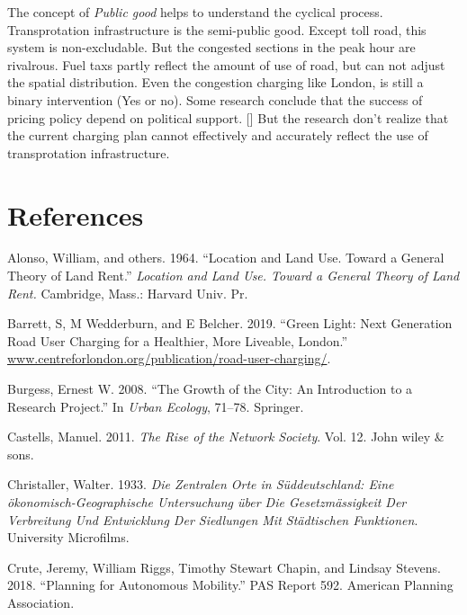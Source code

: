 \documentclass[12pt,]{article}
\begin{document}
The concept of \emph{Public good} helps to understand the cyclical
process. Transprotation infrastructure is the semi-public good. Except
toll road, this system is non-excludable. But the congested sections in
the peak hour are rivalrous. Fuel taxs partly reflect the amount of use
of road, but can not adjust the spatial distribution. Even the
congestion charging like London, is still a binary intervention (Yes or
no). Some research conclude that the success of pricing policy depend on
political support. {[}{]} But the research don't realize that the
current charging plan cannot effectively and accurately reflect the use
of transprotation infrastructure.

\hypertarget{references}{%
\section*{References}\label{references}}

\hypertarget{refs}{}
\leavevmode\hypertarget{ref-alonso1964location}{}%
Alonso, William, and others. 1964. ``Location and Land Use. Toward a
General Theory of Land Rent.'' \emph{Location and Land Use. Toward a
General Theory of Land Rent.} Cambridge, Mass.: Harvard Univ. Pr.

\leavevmode\hypertarget{ref-barrett2019green}{}%
Barrett, S, M Wedderburn, and E Belcher. 2019. ``Green Light: Next
Generation Road User Charging for a Healthier, More Liveable, London.''
\url{www.centreforlondon.org/publication/road-user-charging/}.

\leavevmode\hypertarget{ref-burgess2008growth}{}%
Burgess, Ernest W. 2008. ``The Growth of the City: An Introduction to a
Research Project.'' In \emph{Urban Ecology}, 71--78. Springer.

\leavevmode\hypertarget{ref-castells2011rise}{}%
Castells, Manuel. 2011. \emph{The Rise of the Network Society}. Vol. 12.
John wiley \& sons.

\leavevmode\hypertarget{ref-christaller1933zentralen}{}%
Christaller, Walter. 1933. \emph{Die Zentralen Orte in Süddeutschland:
Eine ökonomisch-Geographische Untersuchung über Die Gesetzmässigkeit Der
Verbreitung Und Entwicklung Der Siedlungen Mit Städtischen Funktionen}.
University Microfilms.

\leavevmode\hypertarget{ref-APA2018autonomous}{}%
Crute, Jeremy, William Riggs, Timothy Stewart Chapin, and Lindsay
Stevens. 2018. ``Planning for Autonomous Mobility.'' PAS Report 592.
American Planning Association.
\end{document}
